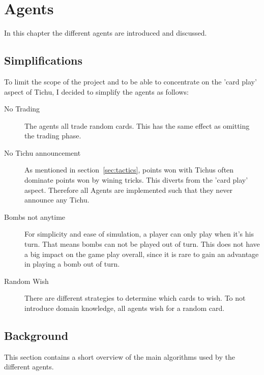 \chapter{Agents}
In this chapter the different agents are introduced and discussed.

\section*{Simplifications}
To limit the scope of the project and to be able to concentrate on the 'card play' aspect of Tichu, I decided to simplify the agents as follows:
\begin{description}
    \item[No Trading] The agents all trade random cards. This has the same effect as omitting the trading phase. %
    \item[No Tichu announcement] As mentioned in section~\ref{sec:tactics}, points won with Tichus often dominate points won by wining tricks. This diverts from the 'card play' aspect. Therefore all Agents are implemented such that they never announce any Tichu. %
    \item[Bombs not anytime] For simplicity and ease of simulation, a player can only play when it's his turn. That means bombs can not be played out of turn. This does not have a big impact on the game play overall, since it is rare to gain an advantage in playing a bomb out of turn.
    \item[Random Wish] There are different strategies to determine which cards to wish. To not introduce domain knowledge, all agents wish for a random card.
\end{description}

\section{Background}
\label{sec:background}
This section contains a short overview of the main algorithms used by the different agents.

